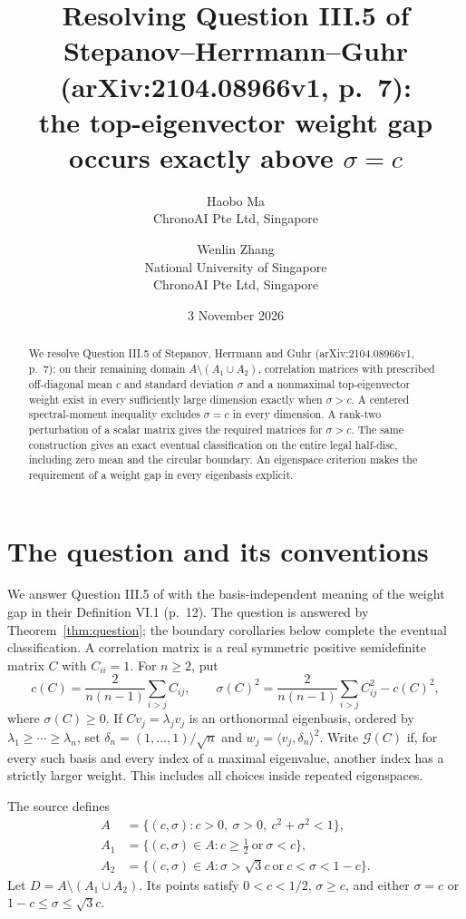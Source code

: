 \documentclass[11pt]{article}
\title{Resolving Question III.5 of Stepanov--Herrmann--Guhr\\
(arXiv:2104.08966v1, p.~7):\\
the top-eigenvector weight gap occurs exactly above $\sigma=c$}
\author{Haobo Ma\\\small ChronoAI Pte Ltd, Singapore
\and Wenlin Zhang\\\small National University of Singapore\\
\small ChronoAI Pte Ltd, Singapore}
\date{3 November 2026}
\newcommand{\G}{\mathcal G}
\begin{document}
\maketitle
\begin{abstract}
We resolve Question III.5 of Stepanov, Herrmann and Guhr
(arXiv:2104.08966v1, p.~7): on their remaining domain
$A\setminus(A_1\cup A_2)$, correlation matrices with prescribed
off-diagonal mean $c$ and standard deviation $\sigma$ and a nonmaximal
top-eigenvector weight exist in every sufficiently large dimension
exactly when $\sigma>c$.
A centered spectral-moment inequality excludes $\sigma=c$ in every
dimension. A rank-two perturbation of a scalar matrix gives the required
matrices for $\sigma>c$. The same construction gives an exact eventual
classification on the entire legal half-disc, including zero mean and
the circular boundary. An eigenspace criterion makes the requirement
of a weight gap in every eigenbasis explicit.
\end{abstract}

\section{The question and its conventions}
We answer Question III.5 of \cite[p.~7]{SHG} with the basis-independent
meaning of the weight gap in their Definition VI.1 (p.~12).
The question is answered by Theorem~\ref{thm:question}; the boundary
corollaries below complete the eventual classification.
A correlation matrix is a real symmetric positive semidefinite matrix
$C$ with $C_{ii}=1$. For $n\ge2$, put
\begin{equation}\label{eq:moments}
 c(C)=\frac{2}{n(n-1)}\sum_{i>j}C_{ij},\qquad
 \sigma(C)^2=\frac{2}{n(n-1)}\sum_{i>j}C_{ij}^2-c(C)^2,
\end{equation}
where $\sigma(C)\ge0$. If $Cv_j=\lambda_jv_j$ is an orthonormal
eigenbasis, ordered by $\lambda_1\ge\cdots\ge\lambda_n$, set
$\delta_n=(1,\ldots,1)/\sqrt n$ and $w_j=\langle v_j,\delta_n\rangle^2$.
Write $\G(C)$ if, for every such basis and every index of a maximal
eigenvalue, another index has a strictly larger weight.
This includes all choices inside repeated eigenspaces.

The source defines
\begin{align*}
 A&=\{(c,\sigma):c>0,\ \sigma>0,\ c^2+\sigma^2<1\},\\
 A_1&=\{(c,\sigma)\in A:c\ge\tfrac12\ \text{or}\ \sigma<c\},\\
 A_2&=\{(c,\sigma)\in A:\sigma>\sqrt3c\ \text{or}\ c<\sigma<1-c\}.
\end{align*}
Let $D=A\setminus(A_1\cup A_2)$. Its points satisfy
$0<c<1/2$, $\sigma\ge c$, and either $\sigma=c$ or
$1-c\le\sigma\le\sqrt3c$.
\end{document}
